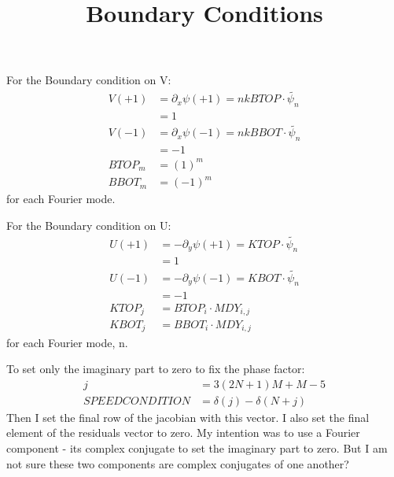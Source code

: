 \documentclass[12,a4paper]{article}
\newcommand{\dd}[1]{\partial_{#1}}
\begin{document}
\title{Boundary Conditions}
\maketitle

\noindent For the Boundary condition on V:
\begin {align}
    V(+1) &= \dd{x} \psi(+1) = nkBTOP \cdot \widetilde{\psi_{n}} \\
	  &= 1 \\
    V(-1) &= \dd{x} \psi(-1) = nkBBOT \cdot \widetilde{\psi_{n}} \\
	  &= -1 \\
    BTOP_{m}  &= (1)^m \\
    BBOT_{m}  &= (-1)^m
\end {align}
for each Fourier mode.

For the Boundary condition on U:
\begin{align}
    U(+1) &= -\dd{y} \psi(+1) = KTOP \cdot \widetilde{\psi_{n}} \\
          &= 1\\
    U(-1) &= -\dd{y} \psi(-1) = KBOT \cdot \widetilde{\psi_{n}} \\
          &= -1 \\
    KTOP_{j}  &= BTOP_{i} \cdot MDY_{i,j} \\
    KBOT_{j}  &= BBOT_{i} \cdot MDY_{i,j}
\end{align}
for each Fourier mode, n.

To set only the imaginary part to zero to fix the phase factor:
\begin{align}
    j &= 3(2N+1)M + M-5 \\
    SPEEDCONDITION &= \delta(j) - \delta(N+j) 
\end{align}
Then I set the final row of the jacobian with this vector. I also set the final element of the residuals vector to zero. My intention was to use a Fourier component - its complex conjugate to set the imaginary part to zero. But I am not sure these two components are complex conjugates of one another?
\end{document}
